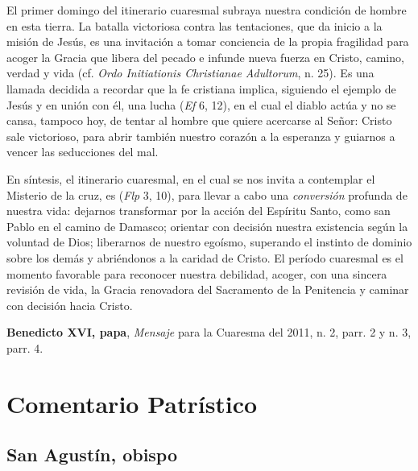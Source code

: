 \begin{patercite}
	El primer domingo del itinerario cuaresmal subraya nuestra condición de hombre en esta tierra. La batalla victoriosa contra las tentaciones, que da inicio a la misión de Jesús, es una invitación a tomar conciencia de la propia fragilidad para acoger la Gracia que libera del pecado e infunde nueva fuerza en Cristo, camino, verdad y vida (cf. \textit{Ordo Initiationis Christianae Adultorum}, n. 25). Es una llamada decidida a	recordar que la fe cristiana implica, siguiendo el ejemplo de Jesús y en unión con él, una lucha 	(\textit{Ef} 6, 12), en el cual el diablo actúa y no se cansa, tampoco hoy, de tentar al hombre que quiere acercarse al Señor: Cristo sale victorioso, para abrir también nuestro corazón a la esperanza y guiarnos a vencer las seducciones del mal.
	
	En síntesis, el itinerario cuaresmal, en el cual se nos invita a contemplar el Misterio de la cruz, es  (\textit{Flp} 3, 10), para llevar a cabo una \textit{conversión} profunda de nuestra vida: dejarnos transformar por la acción del Espíritu Santo, como san Pablo en el camino de Damasco; orientar con decisión nuestra existencia según la voluntad de Dios; liberarnos de nuestro egoísmo, superando el instinto de dominio sobre los demás y abriéndonos a la caridad de Cristo. El período cuaresmal es el momento favorable para reconocer nuestra debilidad, acoger, con una sincera revisión de vida, la Gracia renovadora del Sacramento de la Penitencia y caminar con decisión hacia Cristo.
		
	\textbf{Benedicto XVI, papa}, \textit{Mensaje} para la Cuaresma del 2011, n. 2, parr. 2 y n. 3, parr. 4.
\end{patercite}

\newsection
\section{Comentario Patrístico}

\subsection{San Agustín, obispo}



